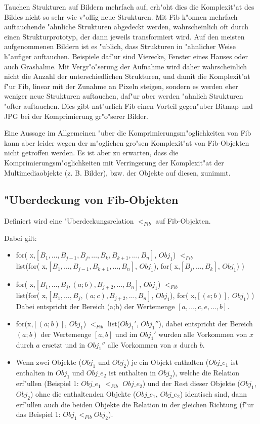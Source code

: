 Tauchen Strukturen auf Bildern mehrfach auf, erh"oht dies die Komplexit"at des Bildes nicht so sehr wie v"ollig neue Strukturen. Mit Fib k"onnen mehrfach auftauchende "ahnliche Strukturen abgedeckt werden, wahrscheinlich oft durch einen Strukturprototyp, der dann jeweils transformiert wird. Auf den meisten aufgenommenen Bildern ist es "ublich, dass Strukturen in "ahnlicher Weise h"aufiger auftauchen. Beispiele daf"ur sind Vierecke, Fenster eines Hauses oder auch Grashalme. Mit Vergr"o"serung der Aufnahme wird daher wahrscheinlich nicht die Anzahl der unterschiedlichen Strukturen, und damit die Komplexit"at f"ur Fib, linear mit der Zunahme an Pixeln steigen, sondern es werden eher weniger neue Strukturen auftauchen, daf"ur aber werden "ahnlich Strukturen "ofter auftauchen. Dies gibt nat"urlich Fib einen Vorteil gegen"uber Bitmap und JPG bei der Komprimierung gr"o"serer Bilder.

Eine Aussage im Allgemeinen "uber die Komprimierungsm"oglichkeiten von Fib kann aber leider wegen der m"oglichen gro"sen Komplexit"at von Fib-Objekten nicht getroffen werden. Es ist aber zu erwarten, dass die Komprimierungsm"oglichkeiten mit Verringerung der Komplexit"at der Multimediaobjekte (z. B. Bilder), bzw. der Objekte auf diesen, zunimmt.



\subsection{"Uberdeckung von Fib-Objekten}
Definiert wird eine "Uberdeckungsrelation $<_{Fib}$ auf Fib-Objekten.

\bigskip\noindent
Dabei gilt:
\begin{itemize}
 \item for( x,$[B_1, \ldots ,B_{j-1}, B_j, \ldots , B_k, B_{k+1}, \ldots ,B_n]$, $Obj_1$) $<_{Fib}$ \\list(for( x,$[B_1, \ldots ,B_{j-1}, B_{k+1}, \ldots ,B_n]$, $Obj_1$), for( x,$[B_j, \ldots , B_k]$, $Obj_1$) )
 \item for( x,$[B_1, \ldots ,B_j, (a;b), B_{j+2}, \ldots ,B_n]$, $Obj_1$) $<_{Fib}$ \\list(for( x,$[B_1, \ldots ,B_j, (a;c), B_{j+2}, \ldots ,B_n]$, $Obj_1$), for( x,$[(e;b)]$, $Obj_1$) ) Dabei entspricht der Bereich (a;b) der Wertemenge $[a, \ldots, c, e, \ldots, b]$.
 \item for(x,$[(a;b)]$, $Obj_{1}$) $<_{Fib}$ list($Obj_1'$, $Obj_1''$), dabei entspricht der Bereich $(a; b)$ der Wertemenge $[a,b]$ und im $Obj_1'$ wurden alle Vorkommen von $x$ durch $a$ ersetzt und in $Obj_1''$ alle Vorkommen von $x$ durch $b$.
 \item Wenn zwei Objekte ($Obj_1$ und $Obj_2$) je ein Objekt enthalten ($Obj\_e_1$ ist enthalten in $Obj_1$ und $Obj\_e_2$ ist enthalten in $Obj_2$), welche die Relation erf"ullen (Beispiel 1: $Obj\_e_1$ $<_{Fib}$ $Obj\_e_2$) und der Rest dieser Objekte ($Obj_1$, $Obj_2$) ohne die enthaltenden Objekte ($Obj\_e_1$, $Obj\_e_2$) identisch sind, dann erf"ullen auch die beiden Objekte die Relation in der gleichen Richtung (f"ur das Beispiel 1: $Obj_1 <_{Fib} Obj_2$).
\end{itemize}

